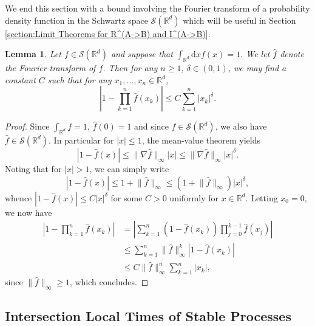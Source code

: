 \documentclass[12pt]{article}
\newcommand{\RR}{\mathbb R}
\newcommand{\1}{\mathds{1}}
\renewcommand{\d}{\mathrm d}
\newtheorem{lemma}{Lemma}
\numberwithin{equation}{section}
\begin{document}
We end this section with a bound involving the Fourier transform of a probability density function in the Schwartz space $\mathcal S(\RR^d)$ which will be useful in Section \ref{section:Limit Theorems for R^(A->B) and I^(A->B)}.

\begin{lemma}
    \label{ineq:bound for products of Fourier transform}
    Let $f\in\mathcal S(\RR^d)$ and suppose that $\int_{\RR^d}\d x f(x)=1$. We let $\hat f$ denote the Fourier transform of $f$. Then for any $n\ge1$, $\delta\in(0,1)$, we may find a constant $C$ such that for any $x_1,\dots,x_n\in\RR^d$,
    \begin{equation*}
        \left|1-\prod_{k=1}^n\hat f(x_k)\right|\le C\sum_{k=1}^n|x_k|^\delta.
    \end{equation*}
\end{lemma}

\begin{proof}
    Since $\int_{\RR^d}f=1$, $\hat f(0)=1$ and since $f\in\mathcal S(\RR^d)$, we also have $\hat f\in\mathcal S(\RR^d)$. In particular for $|x|\le 1$, the mean-value theorem yields
    \begin{equation*}
        \left|1-\hat f(x)\right|\le\lVert\nabla \hat f\rVert_\infty|x|\le \lVert\nabla \hat f\rVert_\infty|x|^\delta.
    \end{equation*}
    Noting that for $|x|>1$, we can simply write
    \begin{equation*}
        \left|1-\hat f(x)\right|\le 1+\lVert \hat f\rVert_\infty\le (1+\lVert \hat f\rVert_\infty)|x|^\delta,
    \end{equation*}
    whence $|1-\hat f(x)|\le C|x|^\delta$  for some $C>0$ uniformly for $x\in\RR^d$. Letting $x_0=0$, we now have 
    \begin{align*}
        \left|1-\prod_{k=1}^n\hat f(x_k)\right|&=\left|\sum_{k=1}^n \left(1-\hat f(x_k)\right)\prod_{j=0}^{k-1}\hat f(x_j)\right|\\
        &\le \sum_{k=1}^n\lVert \hat f\rVert_\infty^k\left|1-\hat f(x_k)\right|\\
        &\le C\lVert\hat f\rVert_\infty^n\sum_{k=1}^n|x_k|,
    \end{align*}
    since $\lVert\hat f\rVert_\infty\ge1$, which concludes.
\end{proof}

\subsection{Intersection Local Times of Stable Processes}
\end{document}
